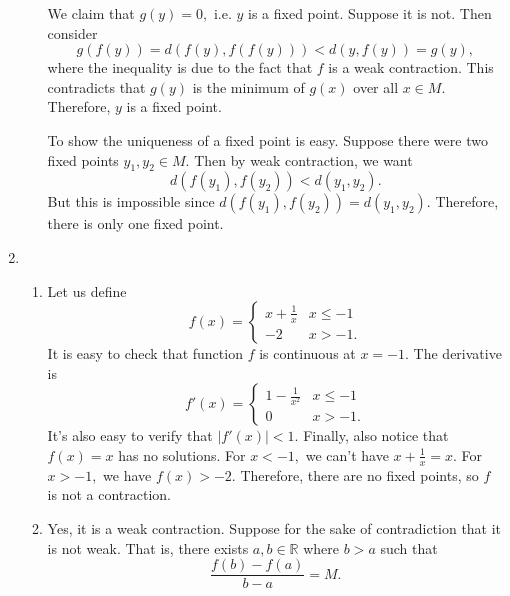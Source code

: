 \documentclass{article}
\numberwithin{equation}{section}
\begin{document}
\begin{enumerate}
\begin{enumerate}[label=(\alph*)]
        We claim that $g(y)=0,$ i.e. $y$ is a fixed point. Suppose it is not. Then consider
        \begin{equation}
            g(f(y)) = d(f(y),f(f(y))) < d(y,f(y)) = g(y),
        \end{equation}
        where the inequality is due to the fact that $f$ is a weak contraction. This contradicts that $g(y)$ is the minimum of $g(x)$ over all $x\in M.$ Therefore, $y$ is a fixed point.

        To show the uniqueness of a fixed point is easy. Suppose there were two fixed points $y_1,y_2\in M.$ Then by weak contraction, we want
        \begin{equation}
            d(f(y_1),f(y_2)) < d(y_1,y_2).
        \end{equation}
        But this is impossible since $d(f(y_1),f(y_2)) = d(y_1,y_2).$ Therefore, there is only one fixed point.
    \end{enumerate}
    \newpage
    \item \begin{enumerate}
        \item Let us define 
        \begin{equation}
            f(x) = \begin{cases}
                x + \frac{1}{x} & x \le - 1 \\ 
                -2 & x > -1.
            \end{cases}
        \end{equation}
        It is easy to check that function $f$ is continuous at $x=-1.$ The derivative is 
        \begin{equation}
            f'(x) = \begin{cases}
                1 - \frac{1}{x^2} & x \le -1 \\
                0 & x > -1.
            \end{cases}
        \end{equation}
        It's also easy to verify that $|f'(x)|<1.$ Finally, also notice that $f(x)=x$ has no solutions. For $x<-1,$ we can't have $x+\frac{1}{x}=x.$ For $x>-1,$ we have $f(x) > -2.$ Therefore, there are no fixed points, so $f$ is not a contraction.
        \item Yes, it is a weak contraction. Suppose for the sake of contradiction that it is not weak. That is, there exists $a,b\in \mathbb{R}$ where $b>a$ such that 
        \begin{equation}
            \frac{f(b)-f(a)}{b-a} = M.
        \end{equation}

\end{enumerate}
\end{enumerate}
\end{document}
